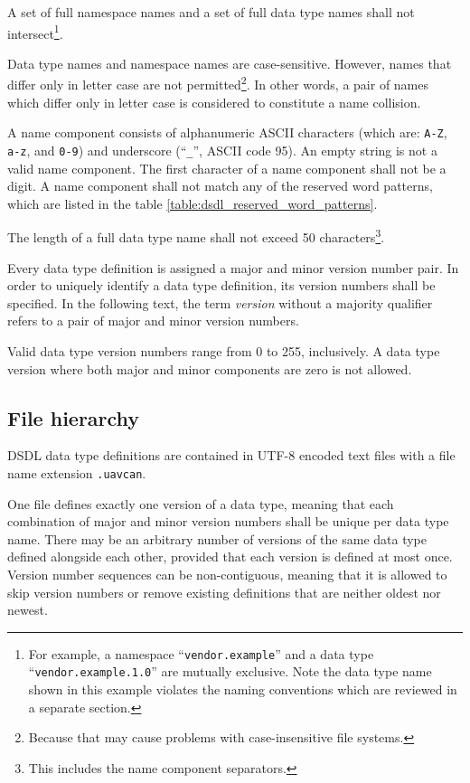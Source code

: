 A set of full namespace names and a set of full data type names shall not intersect\footnote{%
    For example, a namespace ``\texttt{vendor.example}'' and a data type ``\texttt{vendor.example.1.0}''
    are mutually exclusive.
    Note the data type name shown in this example violates the naming conventions
    which are reviewed in a separate section.
}.

Data type names and namespace names are case-sensitive.
However, names that differ only in letter case are not permitted\footnote{%
Because that may cause problems with case-insensitive file systems.}.
In other words, a pair of names which differ only in letter case is considered to constitute a name collision.

A name component consists of alphanumeric ASCII characters (which are: \verb|A-Z|, \verb|a-z|, and \verb|0-9|)
and underscore (``\verb|_|'', ASCII code 95).
An empty string is not a valid name component.
The first character of a name component shall not be a digit.
A name component shall not match any of the reserved word patterns,
which are listed in the table \ref{table:dsdl_reserved_word_patterns}.

The length of a full data type name shall not exceed 50
characters\footnote{This includes the name component separators.}.

Every data type definition is assigned a major and minor version number pair.
In order to uniquely identify a data type definition, its version numbers shall be specified.
In the following text, the term \emph{version} without a majority qualifier refers to
a pair of major and minor version numbers.

Valid data type version numbers range from 0 to 255, inclusively.
A data type version where both major and minor components are zero is not allowed.

\subsection{File hierarchy}

DSDL data type definitions are contained in UTF-8 encoded text files with a file name extension \verb|.uavcan|.

One file defines exactly one version of a data type,
meaning that each combination of major and minor version numbers shall be unique per data type name.
There may be an arbitrary number of versions of the same data type defined alongside each other,
provided that each version is defined at most once.
Version number sequences can be non-contiguous,
meaning that it is allowed to skip version numbers or remove existing definitions that are neither oldest nor newest.

